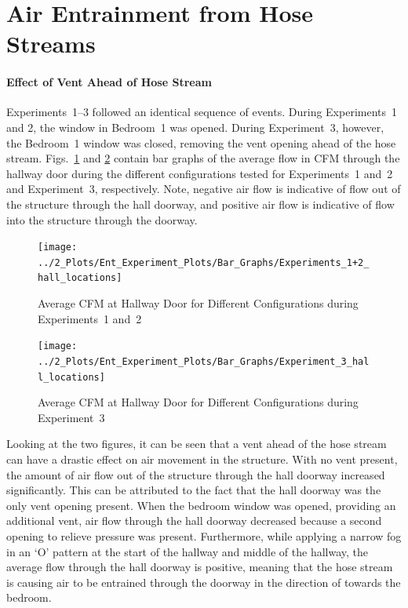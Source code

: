 \documentclass[12pt,oneside]{book}
\begin{document}
\section{Air Entrainment from Hose Streams}

\paragraph{Effect of Vent Ahead of Hose Stream} \mbox{}

Experiments~1--3 followed an identical sequence of events. During Experiments~1 and 2, the window in Bedroom~1 was opened. During Experiment~3, however, the Bedroom~1 window was closed, removing the vent opening ahead of the hose stream. Figs.~\ref{fig:Exp1+2_bar_graph} and \ref{fig:Exp3_bar_graph} contain bar graphs of the average flow in CFM through the hallway door during the different configurations tested for Experiments~1 and~2 and Experiment~3, respectively. Note, negative air flow is indicative of flow out of the structure through the hall doorway, and positive air flow is indicative of flow into the structure through the doorway.
\\
\begin{figure}[H]{}
	\centering
	\texttt{[image: ../2\_Plots/Ent\_Experiment\_Plots/Bar\_Graphs/Experiments\_1+2\_hall\_locations]}
	\caption{Average CFM at Hallway Door for Different Configurations during Experiments~1 and~2}
	\label{fig:Exp1+2_bar_graph}
\end{figure}

\begin{figure}[H]
	\centering
	\texttt{[image: ../2\_Plots/Ent\_Experiment\_Plots/Bar\_Graphs/Experiment\_3\_hall\_locations]}
	\caption{Average CFM at Hallway Door for Different Configurations during Experiment~3}
	\label{fig:Exp3_bar_graph}
\end{figure}

Looking at the two figures, it can be seen that a vent ahead of the hose stream can have a drastic effect on air movement in the structure. With no vent present, the amount of air flow out of the structure through the hall doorway increased significantly. This can be attributed to the fact that the hall doorway was the only vent opening present. When the bedroom window was opened, providing an additional vent, air flow through the hall doorway decreased because a second opening to relieve pressure was present. Furthermore, while applying a narrow fog in an `O' pattern at the start of the hallway and middle of the hallway, the average flow through the hall doorway is positive, meaning that the hose stream is causing air to be entrained through the doorway in the direction of towards the bedroom. 
\end{document}
